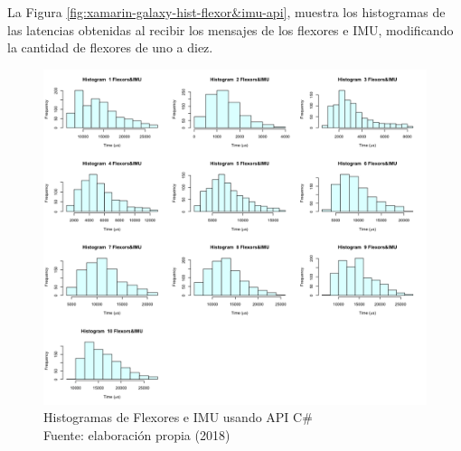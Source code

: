 La Figura \ref{fig:xamarin-galaxy-hist-flexor&imu-api}, muestra los histogramas de las latencias obtenidas al recibir los mensajes de los flexores e IMU, modificando la cantidad de flexores de uno a diez.

\begin{figure}
 \begin{center} 
   	\includegraphics[width=1.0\textwidth]{evaluation/graphics/Xamarin/Galaxy-APITest/HistFlexors&IMUXamarinGalaxy-APITest.png}
   \centering
    \caption[Histogramas de Flexores e IMU usando API C\#]{Histogramas de Flexores e IMU usando API C\# \\Fuente: elaboración propia (2018)}
    \label{fig:xamarin-galaxy-hist-flexors&imu-api}
  \end{center}
\end{figure}


